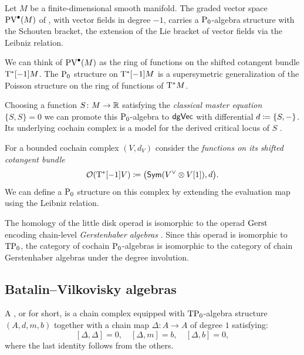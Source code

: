 \begin{example}
	Let \(M\) be a finite-dimensional smooth manifold.
	The graded vector space \(\mathrm{PV}^\bullet(M)\) of , with vector fields in degree \(-1\),  carries a \(\mathrm{P}_0\)-algebra structure with the Schouten bracket, the extension of the Lie bracket of vector fields via the Leibniz relation.

	We can think of \(\mathrm{PV}^\bullet(M)\) as the ring of functions on the shifted cotangent bundle \(\mathrm{T}^*[-1] M\).
	The \(\mathrm{P}_0\) structure on \(\mathrm{T}^*[-1] M\) is a supersymetric generalization of the Poisson structure on the ring of functions of \(\mathrm{T}^*M\).

	Choosing a function \(S \colon M \to \mathbb{R}\)  satisfying the \textit{classical master equation} \(\{S,S\} = 0\) we can promote this \(\mathrm{P}_0\)-algebra to \(\mathsf{dgVec}\)  with differential \(d \coloneqq \{S, -\}\).
	Its underlying cochain complex is a model for the derived critical locus of \(S\) \cite[\S?]{CostelloGwilliam2021FactorizationAlgebrasQFTv2}.
\end{example}

\begin{example}
	For a bounded cochain complex \((V, d_V)\) consider the \textit{functions on its shifted cotangent bundle}
	\[
	\mathcal{O}(\mathrm{T}^*[-1] V) \coloneqq \big(\mathsf{Sym}(V^\vee \otimes V[1]), d\big).
	\]
	We can define a \(\mathrm{P}_0\) structure on this complex by extending the evaluation map using the Leibniz relation.
\end{example}

The homology of the little disk operad is isomorphic to the operad \(\mathrm{Gerst} \) encoding chain-level \textit{Gerstenhaber algebras} \cite{Cohen76}. Since this operad is isomorphic to \(\mathrm{T}\mathrm{P}_0\), the category of cochain \(\mathrm{P}_0\)-algebras 
is isomorphic to the category of chain Gerstenhaber algebras under the degree involution. 

\subsection{Batalin--Vilkovisky algebras}
A , or  for short, is a chain complex equipped with  \(\mathrm{T}\mathrm{P}_0\)-algebra structure \((A, d, m, b)\) together with a chain map \(\Delta \colon A \to A\) of degree \(1\) satisfying:
\[
[\Delta, \Delta] = 0, \quad
[\Delta, m] = b, \quad
[\Delta, b] = 0, 
\]
where the last identity follows from the others.

